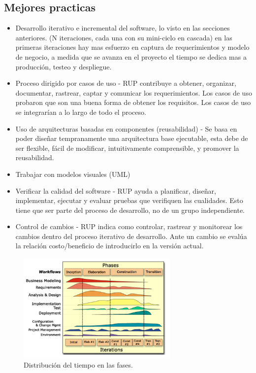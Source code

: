 \documentclass[titlepage,a4paper]{article}
\begin{document}
\subsection*{Mejores practicas}
\begin{itemize}
    \item Desarrollo iterativo e incremental del software, lo visto en las secciones anteriores. (N iteraciones, cada una con su mini-ciclo en cascada) en las primeras iteraciones hay mas esfuerzo en captura de requerimientos y modelo de negocio, a medida que se avanza en el proyecto el tiempo se dedica mas a producción, testeo y despliegue. 
    \item Proceso dirigido por casos de uso - RUP contribuye a obtener, organizar, documentar, rastrear, captar y comunicar los requerimientos. Los casos de uso probaron que son una buena forma de obtener los requisitos. Los casos de uso se integrarían a lo largo de todo el proceso.
    \item Uso de arquitecturas basadas en componentes (reusabilidad) - Se basa en poder diseñar tempranamente una arquitectura base ejecutable, esta debe de ser flexible, fácil de modificar, intuitivamente comprensible, y promover la reusabilidad.
    \item Trabajar con modelos visuales (UML)
    \item Verificar la calidad del software - RUP ayuda a planificar, diseñar, implementar, ejecutar y evaluar pruebas que verifiquen las cualidades. Esto tiene que ser parte del proceso de desarrollo, no de un grupo independiente.
    \item Control de cambios - RUP indica como controlar, rastrear y monitorear los cambios dentro del proceso iterativo de desarrollo. Ante un cambio se evalúa la relación costo/beneficio de introducirlo en la versión actual.
\end{itemize}

\begin{figure}[!htb]
    \centering
    \includegraphics[width=0.7\textwidth]{Imagenes/DistribucionTiempoDesarrollo.PNG}
    \caption{Distribución del tiempo en las fases.}
\end{figure}
\end{document}

